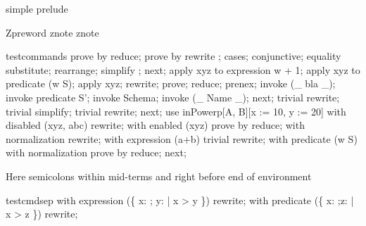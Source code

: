 \begin{zsection}
   \SECTION simple \parents prelude
\end{zsection}

Zpreword znote znote  %

\begin{zproof}{testcommands}
prove     by      reduce;
prove by rewrite ; %
cases;
  conjunctive;
  equality substitute;
  rearrange;
  simplify ;
next;
  apply xyz to expression w + 1;
  apply xyz to predicate (w \in S);
  apply xyz; %
  rewrite;
  prove;
  reduce;
  prenex;
  invoke (\_ bla \_);
  invoke predicate S';
  invoke Schema;
  invoke (\_ Name \_);
next;
  trivial rewrite;
  trivial simplify;
  trivial rewrite;
next;
  use inPowerp[A, B][x := 10, y := 20]
  with disabled (xyz, abc) rewrite;
  with enabled (xyz) prove by reduce;
  with normalization rewrite;
  with expression (a+b) trivial rewrite;
  with predicate (w \in S)
    with normalization prove by reduce;
next;
\end{zproof}

Here semicolons within mid-terms and right before end of environment
\begin{zproof}{testcmdsep}
  with expression (\{ x: \nat; y: \arithmos | x > y \}) rewrite; %
  with predicate (\{ x: \nat;z: \arithmos | x > z \}) rewrite;
\end{zproof}
